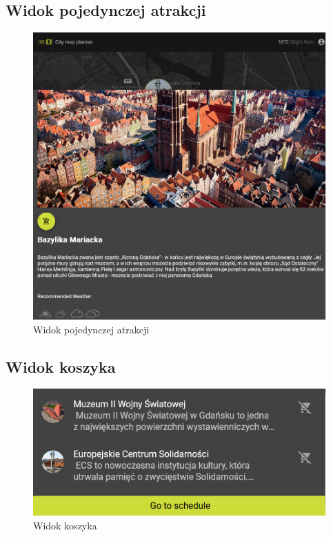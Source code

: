 \subsection{Widok pojedynczej atrakcji}
\label{sec:atrakcjawidok}
\begin{figure}[H]
        \centering
        \includegraphics[width=1\textwidth]{attachments/atrakcjawidok}
        \caption{Widok pojedynczej atrakcji}
        \label{fig:mapawidok}
\end{figure}

\subsection{Widok koszyka}
\label{sec:koszyk}
    \begin{figure}[H]
        \centering
        \includegraphics[width=1\textwidth]{attachments/koszyk}
        \caption{Widok koszyka}
        \label{fig:koszyk}
\end{figure}


